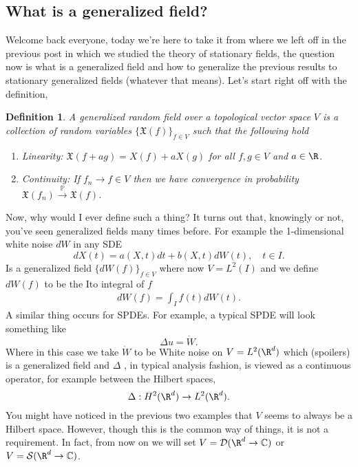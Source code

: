 \documentclass[12pt]{article}
\newtheorem{definition}{Definition}
\begin{document}
\begin{CJK*}{UTF8}{gbsn}
	\section{What is a generalized field?}
	Welcome back everyone, today we're here to take it from where we left off in the previous post in which we studied the theory of stationary fields, the question now is what is a generalized field and how to generalize the previous results to stationary generalized fields (whatever that means). Let's start right off with the definition,
	\begin{definition}\label{gen field def}
		A generalized random field over a topological vector space $V$ is a collection of random variables  $\{\mathfrak{X}(f)\}_{f\in V}$ such that the following hold
		\begin{enumerate}
			\item \emph{Linearity}: $\mathfrak{X}(f+ag)=X(f)+aX(g)$ for all  $f,g\in V$ and $a\in \R$.
			\item \emph{Continuity}: If $f_n\to f\in V$ then we have convergence in probability $\mathfrak{X}(f_n)\xrightarrow{\mathbb{P}}\mathfrak{X}(f)$.
		\end{enumerate}
	\end{definition}
	Now, why would I ever define such a thing? It turns out that, knowingly or not, you've seen generalized fields many times before. For example the 1-dimensional white noise  $dW$ in any SDE
	\begin{equation*}
		dX(t)=a(X,t)d t  +b(X,t)dW(t),\quad t\in I.
	\end{equation*}
	Is a generalized field $\{dW(f)\}_{f \in V}$ where now $V=L^2(I)$ and we define $dW(f)$ to be the Ito integral of  $f$
	\begin{align*}
		dW(f)= \int_{I} f(t)dW(t)
		.\end{align*}
	A similar thing occurs for SPDEs. For example, a typical SPDE will look something like
	\begin{equation*}
		\Delta u=\dot{W}.
	\end{equation*}
	Where in this case we take $\dot{W}$ to be White noise on $V=L^2(\R^d)$  which (spoilers) is a generalized field and $\Delta $ , in typical analysis fashion, is viewed as a continuous operator, for example between  the Hilbert spaces, $$\Delta :H^2(\R^d)\to L^2(\R^d).$$ You might have noticed in the previous two examples that $V$ seems to always be a Hilbert space. However, though this is the common way of things, it is not a requirement. In fact, from now on we will set $V=\mathcal{D}(\R^d\to\C)$ or $V=\Ss(\R^d\to\C)$.\\

\end{CJK*}
\end{document}
